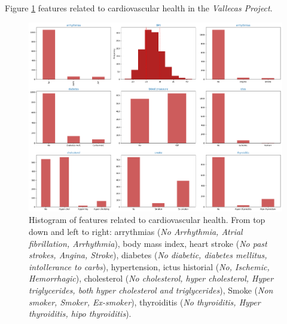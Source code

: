 \documentclass[11pt]{article}
\theoremstyle{definition}
\theoremstyle{remark}
\begin{document}
Figure \ref{fig:cardio} features related to cardiovascular health in the \emph{Vallecas Project}.



\begin{figure}[H]
        \centering
        \includegraphics[keepaspectratio, width=\linewidth]{figures/Fig_cardio}
        \caption{Histogram of features related to cardiovascular health. From top down and left to right: arrythmias (\emph{No Arrhythmia, Atrial fibrillation, Arrhythmia}), body mass index, heart stroke (\emph{No past strokes, Angina, Stroke}), diabetes (\emph{No diabetic, diabetes mellitus, intollerance to carbs}), hypertension, ictus historial (\emph{No, Ischemic, Hemorrhagic}), cholesterol (\emph{No cholesterol, hyper cholesterol, Hyper triglycerides, both hyper cholesterol and triglycerides}), Smoke (\emph{Non smoker, Smoker, Ex-smoker}), thyroiditis (\emph{No thyroiditis, Hyper thyroiditis, hipo thyroiditis}). } 
        \label{fig:cardio}
\end{figure}
\end{document}
